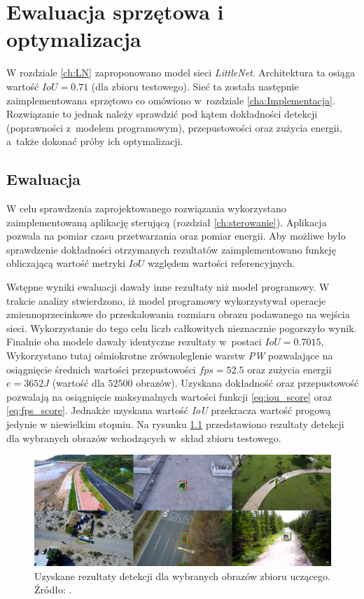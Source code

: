 \chapter{Ewaluacja sprzętowa i optymalizacja}
\label{cha:Optymalizacja}

W rozdziale \ref{ch:LN} zaproponowano model sieci \emph{LittleNet}. 
Architektura ta osiąga wartość $IoU = 0.71$ (dla zbioru testowego). 
Sieć ta została następnie zaimplementowana sprzętowo co omówiono w~rozdziale \ref{cha:Implementacja}.
Rozwiązanie to jednak należy sprawdzić pod kątem dokładności detekcji (poprawności z~modelem programowym), przepustowości oraz zużycia energii, a~także dokonać próby ich optymalizacji. 


\section{Ewaluacja}

W celu sprawdzenia zaprojektowanego rozwiązania wykorzystano zaimplementowaną aplikację sterującą (rozdział \ref{ch:sterowanie}).
Aplikacja pozwala na pomiar czasu przetwarzania oraz pomiar energii.
Aby możliwe było sprawdzenie dokładności otrzymanych rezultatów zaimplementowano funkcję obliczającą wartość metryki $IoU$ względem wartości referencyjnych.

Wstępne wyniki ewaluacji dawały inne rezultaty niż model programowy.
W trakcie analizy stwierdzono, iż model programowy wykorzystywał operacje zmiennoprzecinkowe do przeskalowania rozmiaru obrazu podawanego na wejścia sieci.
Wykorzystanie do tego celu liczb całkowitych nieznacznie pogorszyło wynik.
Finalnie oba modele dawały identyczne rezultaty w~postaci $IoU = 0.7015$, 
Wykorzystano tutaj ośmiokrotne zrównoleglenie warstw \emph{PW} pozwalające na osiągnięcie średnich wartości przepustowości $fps = 52.5$ oraz zużycia energii $e = 3652 J$ (wartość dla $52 500$ obrazów). 
Uzyskana dokładność oraz przepustowość pozwalają na osiągnięcie maksymalnych wartości funkcji \eqref{eq:iou_score} oraz \eqref{eq:fps_score}.
Jednakże uzyskana wartość \emph{IoU} przekracza wartość progową jedynie w niewielkim stopniu.
Na rysunku \ref{fig:results} przedstawiono rezultaty detekcji dla wybranych obrazów wchodzących w~skład zbioru testowego.

\begin{figure}
    \centering
    \includegraphics[width=0.9\linewidth]{images/results.png}
    \caption{Uzyskane rezultaty detekcji dla wybranych obrazów zbioru uczącego. 
    Źródło: \cite{dac_sdc_2021}.}
    \label{fig:results}
\end{figure}

